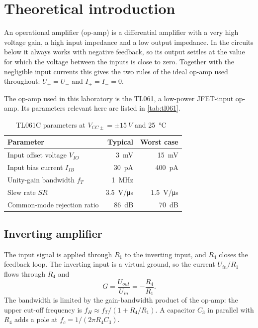 \section{Theoretical introduction}
\nocite{TietzeSchenk, TL06x}
An operational amplifier (op-amp) is a differential amplifier with a very high voltage gain, a high input impedance and a low output impedance.
In the circuits below it always works with negative feedback, so its output settles at the value for which the voltage between the inputs is close to zero.
Together with the negligible input currents this gives the two rules of the ideal op-amp used throughout: $U_+ = U_-$ and $I_+ = I_- = 0$.

The op-amp used in this laboratory is the TL061, a low-power JFET-input op-amp.
Its parameters relevant here are listed in \autoref{tab:tl061}.
\begin{table}[ht]
  \centering
  \caption{TL061C parameters at $V_{CC\pm} = \pm\qty{15}{V}$ and \qty{25}{\celsius}~\cite{TL06x}}
  \label{tab:tl061}
  \begin{tabular}{lrr}
    \hline
    Parameter & Typical & Worst case \\
    \hline
    Input offset voltage $V_{IO}$ & \qty{3}{mV} & \qty{15}{mV} \\
    Input bias current $I_{IB}$ & \qty{30}{pA} & \qty{400}{pA} \\
    Unity-gain bandwidth $f_T$ & \qty{1}{MHz} & \\
    Slew rate $SR$ & \qty{3.5}{V/\us} & \qty{1.5}{V/\us} \\
    Common-mode rejection ratio & \qty{86}{dB} & \qty{70}{dB} \\
    \hline
  \end{tabular}
\end{table}

\subsection{Inverting amplifier}\label{sec:th_inverting}
The input signal is applied through $R_1$ to the inverting input, and $R_4$ closes the feedback loop.
The inverting input is a virtual ground, so the current $U_{in}/R_1$ flows through $R_4$ and
\begin{equation}\label{eqn:inverting}
  G = \frac{U_{out}}{U_{in}} = -\frac{R_4}{R_1}.
\end{equation}
The bandwidth is limited by the gain-bandwidth product of the op-amp: the upper cut-off frequency is $f_H \approx f_T / (1 + R_4/R_1)$.
A capacitor $C_3$ in parallel with $R_4$ adds a pole at $f_c = 1/(2\pi R_4 C_3)$.

